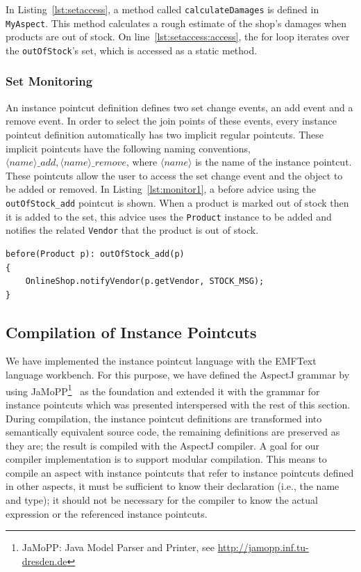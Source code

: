 \documentclass{acm_proc_article-sp}
\begin{document}
In Listing~\ref{lst:setaccess},  a method called \lstinline{calculateDamages} is defined in \lstinline{MyAspect}. This method calculates a rough estimate of the shop's damages when products are out of stock. On line~\ref{lst:setaccess:access}, the for loop iterates over the \lstinline{outOfStock}'s set, which is accessed as a static method.


\subsubsection{Set Monitoring}
An instance pointcut definition defines two set change events, an add event and a remove event. In order to select the join points of these events, every instance pointcut definition automatically has two implicit regular pointcuts. These implicit pointcuts have the following naming conventions, $\langle name \rangle\_add, \langle name \rangle\_remove$, where $\langle name \rangle$ is the name of the instance pointcut. These pointcuts allow the user to access the set change event and the object to be added or removed. In Listing~\ref{lst:monitor1}, a before advice using the \lstinline{outOfStock_add} pointcut is shown. When a product is marked out of stock then it is added to the set, this advice uses the \lstinline{Product} instance to be added and notifies the related \lstinline{Vendor} that the product is out of stock.

\begin{lstlisting}[float=h!, caption={Set monitoring pointcut used to notify vendors}, label={lst:monitor1}]
before(Product p): outOfStock_add(p)
{
	OnlineShop.notifyVendor(p.getVendor, STOCK_MSG);
}
\end{lstlisting}






\subsection{Compilation of Instance Pointcuts}


We have implemented the instance pointcut language with the EMFText language workbench.
For this purpose, we have defined the AspectJ grammar by using JaMoPP\footnote{JaMoPP: Java Model Parser and Printer, see \url{http://jamopp.inf.tu-dresden.de}}~\cite{jamopp2010} as the foundation and extended it with the grammar for instance pointcuts which was presented interspersed with the rest of this section.
During compilation, the instance pointcut definitions are transformed into semantically equivalent source code, the remaining definitions are preserved as they are; the result is compiled with the AspectJ compiler.
A goal for our compiler implementation is to support modular compilation.
This means to compile an aspect with instance pointcuts that refer to instance pointcuts defined in other aspects, it must be sufficient to know their declaration (i.e., the name and type); it should not be necessary for the compiler to know the actual expression or the referenced instance pointcuts.
\end{document}

